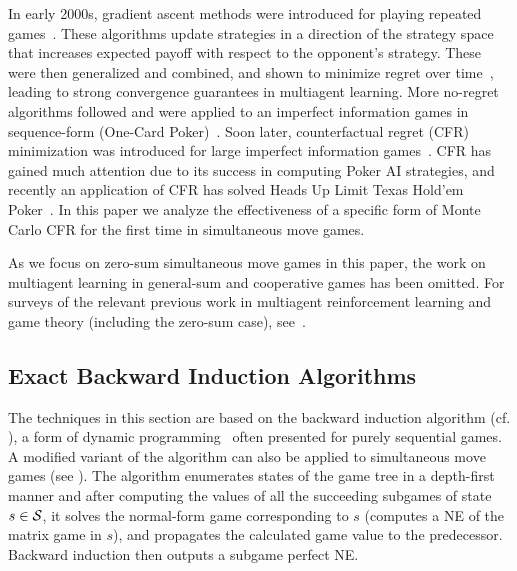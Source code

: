 In early 2000s, gradient ascent methods were introduced for playing 
repeated games~\cite{Singh02Nash,Bowling01WoLF}. These algorithms update strategies in a direction of the strategy space 
that increases expected payoff with respect to the opponent's strategy. These were then generalized and combined, and 
shown to minimize regret over time~\cite{Zinkevich03Online,Bowling05Convergence}, leading to strong convergence 
guarantees in multiagent learning. More no-regret algorithms followed and were applied to an imperfect information 
games in sequence-form (One-Card Poker)~\cite{Gordon06No}. Soon later, counterfactual regret (CFR) minimization was 
introduced for large imperfect information games~\cite{CFR}. CFR has gained much attention due to its success in 
computing Poker AI strategies, and recently an application of CFR has solved Heads Up Limit Texas Hold'em Poker~\cite{Bowling15science}.
In this paper we analyze the effectiveness of a specific form of Monte Carlo CFR for the first time in simultaneous move games. 

As we focus on zero-sum simultaneous move games in this paper, the work on multiagent learning in general-sum and 
cooperative games has been omitted. For surveys of the relevant previous work in multiagent 
reinforcement learning and game theory (including the zero-sum case), 
see~\cite{Nowe12MARLchapter,Busoniu08Comprehensive,Bloembergen15Evolutionary}.

\subsection{Exact Backward Induction Algorithms}

The techniques in this section are based on the backward induction algorithm (cf. \cite{Shoham09}), 
a form of dynamic programming~\cite{Bellman57} often presented for purely sequential games. 
A modified variant of the algorithm can also be applied to simultaneous move 
games (\eg see \cite{Ross71Goofspiel,buro2003,Rhoads12Computer}). 
The algorithm enumerates states of the game tree in a depth-first manner and after computing the values of all the succeeding subgames of state $s \in \mathcal{S}$, 
it solves the normal-form game corresponding to $s$ (\ie computes a NE of the matrix game in $s$), and propagates the calculated game value to the predecessor.
Backward induction then outputs a subgame perfect NE. 

